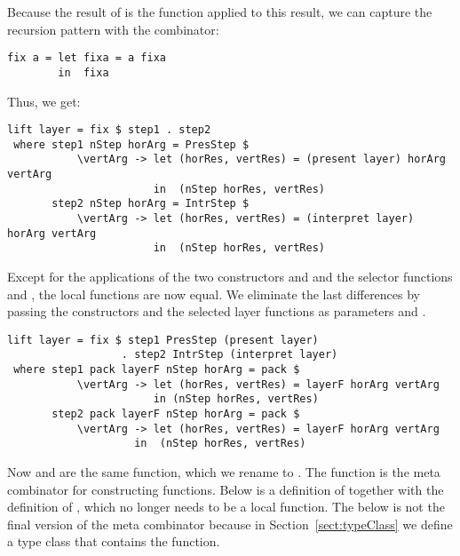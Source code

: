 \documentclass[preprint,natbib]{sigplanconf}
\begin{document}
Because the result of  is the function  applied to this result, we can capture the recursion pattern with  the  combinator:

\begin{small}
\begin{verbatim}
fix a = let fixa = a fixa
        in  fixa
\end{verbatim}
\end{small}

Thus, we get:

\begin{small} %
\begin{verbatim}
lift layer = fix $ step1 . step2 
 where step1 nStep horArg = PresStep $ 
           \vertArg -> let (horRes, vertRes) = (present layer) horArg vertArg                                         
                       in  (nStep horRes, vertRes)
       step2 nStep horArg = IntrStep $
           \vertArg -> let (horRes, vertRes) = (interpret layer) horArg vertArg                     
                       in  (nStep horRes, vertRes)
\end{verbatim}
\end{small}

Except for the applications of the two constructors  and  and the selector functions  and , the local functions are now equal. We eliminate the last differences by passing the constructors and the selected layer functions as parameters  and .

\begin{small} %
\begin{verbatim}
lift layer = fix $ step1 PresStep (present layer) 
                  . step2 IntrStep (interpret layer) 
 where step1 pack layerF nStep horArg = pack $ 
           \vertArg -> let (horRes, vertRes) = layerF horArg vertArg                                         
                       in (nStep horRes, vertRes)
       step2 pack layerF nStep horArg = pack $
           \vertArg -> let (horRes, vertRes) = layerF horArg vertArg                     
                    in  (nStep horRes, vertRes)
\end{verbatim}
\end{small}

Now  and  are the same function, which we rename to .  The function  is the meta combinator for constructing  functions. Below is a definition of  together with the definition of , which no longer needs to be a local function. The  below is not the final version of the meta combinator because in Section~\ref{sect:typeClass} we define a type class that contains the  function.
\end{document}
